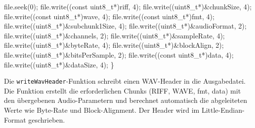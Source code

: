 \documentclass[
  ngerman,
  letterpaper,
  DIV=11]{scrreprt}
\newenvironment{Shaded}{\begin{snugshade}}{\end{snugshade}}
\newcommand{\AttributeTok}[1]{\textcolor[rgb]{0.40,0.45,0.13}{#1}}
\newcommand{\DataTypeTok}[1]{\textcolor[rgb]{0.68,0.00,0.00}{#1}}
\newcommand{\DecValTok}[1]{\textcolor[rgb]{0.68,0.00,0.00}{#1}}
\newcommand{\NormalTok}[1]{\textcolor[rgb]{0.00,0.23,0.31}{#1}}
\newcommand{\OperatorTok}[1]{\textcolor[rgb]{0.37,0.37,0.37}{#1}}
\begin{document}
\begin{Shaded}
\begin{Highlighting}[]
\NormalTok{  file}\OperatorTok{.}\NormalTok{seek}\OperatorTok{(}\DecValTok{0}\OperatorTok{);}
\NormalTok{  file}\OperatorTok{.}\NormalTok{write}\OperatorTok{((}\AttributeTok{const} \DataTypeTok{uint8\_t}\OperatorTok{*)}\NormalTok{riff}\OperatorTok{,} \DecValTok{4}\OperatorTok{);}
\NormalTok{  file}\OperatorTok{.}\NormalTok{write}\OperatorTok{((}\DataTypeTok{uint8\_t}\OperatorTok{*)\&}\NormalTok{chunkSize}\OperatorTok{,} \DecValTok{4}\OperatorTok{);}
\NormalTok{  file}\OperatorTok{.}\NormalTok{write}\OperatorTok{((}\AttributeTok{const} \DataTypeTok{uint8\_t}\OperatorTok{*)}\NormalTok{wave}\OperatorTok{,} \DecValTok{4}\OperatorTok{);}
\NormalTok{  file}\OperatorTok{.}\NormalTok{write}\OperatorTok{((}\AttributeTok{const} \DataTypeTok{uint8\_t}\OperatorTok{*)}\NormalTok{fmt}\OperatorTok{,} \DecValTok{4}\OperatorTok{);}
\NormalTok{  file}\OperatorTok{.}\NormalTok{write}\OperatorTok{((}\DataTypeTok{uint8\_t}\OperatorTok{*)\&}\NormalTok{subchunk1Size}\OperatorTok{,} \DecValTok{4}\OperatorTok{);}
\NormalTok{  file}\OperatorTok{.}\NormalTok{write}\OperatorTok{((}\DataTypeTok{uint8\_t}\OperatorTok{*)\&}\NormalTok{audioFormat}\OperatorTok{,} \DecValTok{2}\OperatorTok{);}
\NormalTok{  file}\OperatorTok{.}\NormalTok{write}\OperatorTok{((}\DataTypeTok{uint8\_t}\OperatorTok{*)\&}\NormalTok{channels}\OperatorTok{,} \DecValTok{2}\OperatorTok{);}
\NormalTok{  file}\OperatorTok{.}\NormalTok{write}\OperatorTok{((}\DataTypeTok{uint8\_t}\OperatorTok{*)\&}\NormalTok{sampleRate}\OperatorTok{,} \DecValTok{4}\OperatorTok{);}
\NormalTok{  file}\OperatorTok{.}\NormalTok{write}\OperatorTok{((}\DataTypeTok{uint8\_t}\OperatorTok{*)\&}\NormalTok{byteRate}\OperatorTok{,} \DecValTok{4}\OperatorTok{);}
\NormalTok{  file}\OperatorTok{.}\NormalTok{write}\OperatorTok{((}\DataTypeTok{uint8\_t}\OperatorTok{*)\&}\NormalTok{blockAlign}\OperatorTok{,} \DecValTok{2}\OperatorTok{);}
\NormalTok{  file}\OperatorTok{.}\NormalTok{write}\OperatorTok{((}\DataTypeTok{uint8\_t}\OperatorTok{*)\&}\NormalTok{bitsPerSample}\OperatorTok{,} \DecValTok{2}\OperatorTok{);}
\NormalTok{  file}\OperatorTok{.}\NormalTok{write}\OperatorTok{((}\AttributeTok{const} \DataTypeTok{uint8\_t}\OperatorTok{*)}\NormalTok{data}\OperatorTok{,} \DecValTok{4}\OperatorTok{);}
\NormalTok{  file}\OperatorTok{.}\NormalTok{write}\OperatorTok{((}\DataTypeTok{uint8\_t}\OperatorTok{*)\&}\NormalTok{dataSize}\OperatorTok{,} \DecValTok{4}\OperatorTok{);}
\OperatorTok{\}}
\end{Highlighting}
\end{Shaded}

Die \texttt{writeWavHeader}-Funktion schreibt einen WAV-Header in die
Ausgabedatei. Die Funktion erstellt die erforderlichen Chunks (RIFF,
WAVE, fmt, data) mit den übergebenen Audio-Parametern und berechnet
automatisch die abgeleiteten Werte wie Byte-Rate und Block-Alignment.
Der Header wird im Little-Endian-Format geschrieben.
\end{document}
